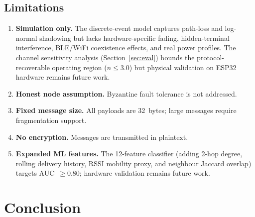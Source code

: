 \documentclass[conference]{IEEEtran}
\begin{document}
\subsection{Limitations}
\begin{enumerate}
  \item \textbf{Simulation only.}  The discrete-event model captures path-loss
        and log-normal shadowing but lacks hardware-specific fading, hidden-terminal
        interference, BLE/WiFi coexistence effects, and real power profiles.
        The channel sensitivity analysis (Section~\ref{sec:eval}) bounds the
        protocol-recoverable operating region ($n \leq 3.0$) but physical
        validation on ESP32 hardware remains future work.
  \item \textbf{Honest node assumption.}  Byzantine fault tolerance is
        not addressed.
  \item \textbf{Fixed message size.}  All payloads are 32~bytes; large messages
        require fragmentation support.
  \item \textbf{No encryption.}  Messages are transmitted in plaintext.
  \item \textbf{Expanded ML features.}  The 12-feature classifier (adding
        2-hop degree, rolling delivery history, RSSI mobility proxy, and
        neighbour Jaccard overlap) targets AUC~$\geq 0.80$; hardware
        validation remains future work.
\end{enumerate}

\section{Conclusion}
\label{sec:conclusion}
\end{document}
